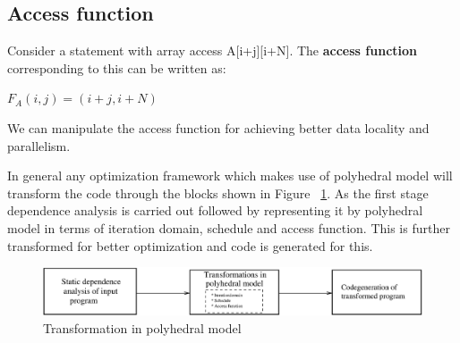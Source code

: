 \subsection{Access function}
Consider a statement with array access A[i+j][i+N]. The \textbf{access function} corresponding to this can be written
as:
\begin{center}
$F_A(i,j) = (i+j,i+N)$
\end{center}
We can manipulate the access function for achieving better data locality and parallelism.

In general any optimization framework which makes use of polyhedral model will
transform the code through the blocks shown in Figure ~\ref{fig:poly_steps}.
As the first stage dependence analysis is carried out followed by representing
it by polyhedral model in terms of iteration domain, schedule and access function.
This is further transformed for better optimization and code is generated
for this.
\begin{figure}
  \includegraphics[width=1\textwidth]{images/poly_steps.eps}
  \caption{Transformation in polyhedral model}
  \label{fig:poly_steps}
\end{figure}
